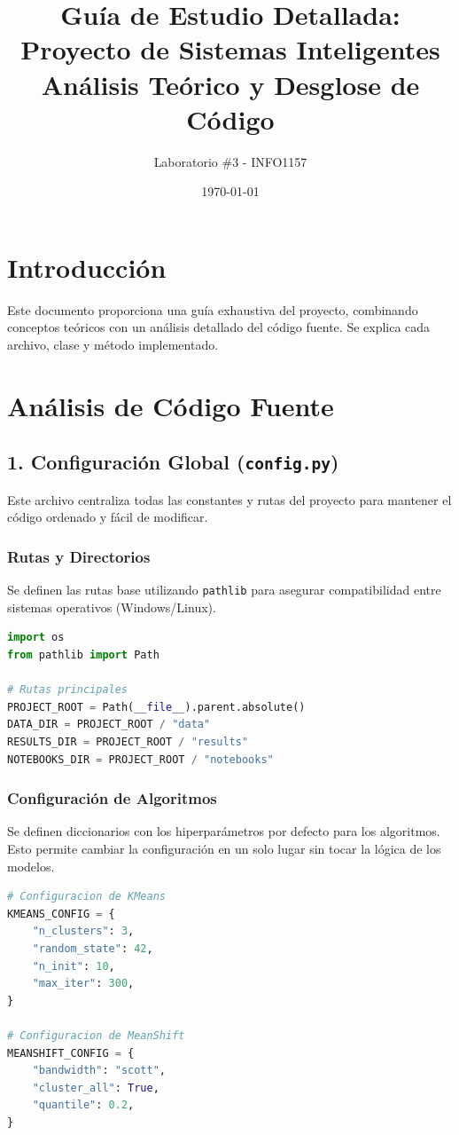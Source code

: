 \documentclass[12pt, a4paper]{article}
\title{Guía de Estudio Detallada: Proyecto de Sistemas Inteligentes\\
\large Análisis Teórico y Desglose de Código}
\author{Laboratorio \#3 - INFO1157}
\date{\today}
\begin{document}
\maketitle
\tableofcontents
\newpage

\section{Introducción}
Este documento proporciona una guía exhaustiva del proyecto, combinando conceptos teóricos con un análisis detallado del código fuente. Se explica cada archivo, clase y método implementado.

\section{Análisis de Código Fuente}

\subsection{1. Configuración Global (\texttt{config.py})}
Este archivo centraliza todas las constantes y rutas del proyecto para mantener el código ordenado y fácil de modificar.

\subsubsection{Rutas y Directorios}
Se definen las rutas base utilizando \texttt{pathlib} para asegurar compatibilidad entre sistemas operativos (Windows/Linux).
\begin{lstlisting}[language=Python]
import os
from pathlib import Path

# Rutas principales
PROJECT_ROOT = Path(__file__).parent.absolute()
DATA_DIR = PROJECT_ROOT / "data"
RESULTS_DIR = PROJECT_ROOT / "results"
NOTEBOOKS_DIR = PROJECT_ROOT / "notebooks"
\end{lstlisting}

\subsubsection{Configuración de Algoritmos}
Se definen diccionarios con los hiperparámetros por defecto para los algoritmos. Esto permite cambiar la configuración en un solo lugar sin tocar la lógica de los modelos.
\begin{lstlisting}[language=Python]
# Configuracion de KMeans
KMEANS_CONFIG = {
    "n_clusters": 3,
    "random_state": 42,
    "n_init": 10,
    "max_iter": 300,
}

# Configuracion de MeanShift
MEANSHIFT_CONFIG = {
    "bandwidth": "scott",
    "cluster_all": True,
    "quantile": 0.2,
}
\end{lstlisting}
\end{document}
